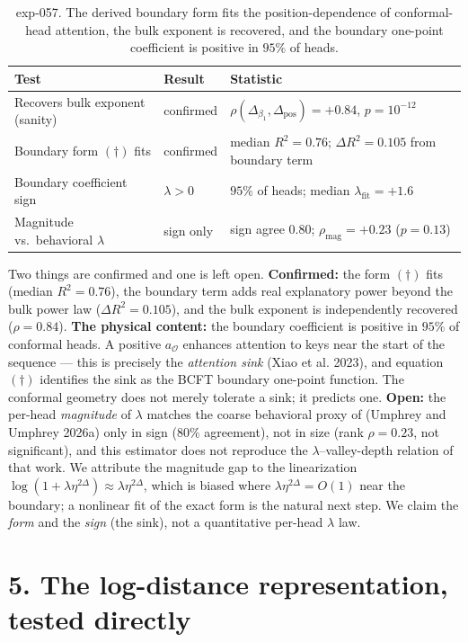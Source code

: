 \begin{table}[H]
\centering
\begin{tabular}{lll}
\toprule
Test & Result & Statistic \\
\midrule
Recovers bulk exponent (sanity) & confirmed & $\rho(\Delta_{\beta_1},\Delta_{\text{pos}}) = +0.84$, $p=10^{-12}$ \\
Boundary form $(\dagger)$ fits & confirmed & median $R^2 = 0.76$; $\Delta R^2 = 0.105$ from boundary term \\
Boundary coefficient sign & $\lambda > 0$ & $95\%$ of heads; median $\lambda_{\text{fit}} = +1.6$ \\
Magnitude vs.\ behavioral $\lambda$ & sign only & sign agree $0.80$; $\rho_{\text{mag}}=+0.23$ ($p=0.13$) \\
\bottomrule
\end{tabular}
\caption{exp-057. The derived boundary form fits the position-dependence
of conformal-head attention, the bulk exponent is recovered, and the
boundary one-point coefficient is positive in $95\%$ of heads.}
\end{table}

Two things are confirmed and one is left open. \textbf{Confirmed:} the
form \((\dagger)\) fits (median \(R^2 = 0.76\)), the boundary term adds
real explanatory power beyond the bulk power law
(\(\Delta R^2 = 0.105\)), and the bulk exponent is independently
recovered (\(\rho = 0.84\)). \textbf{The physical content:} the boundary
coefficient is positive in \(95\%\) of conformal heads. A positive
\(a_{\mathcal O}\) enhances attention to keys near the start of the
sequence --- this is precisely the \emph{attention sink} (Xiao et al.
2023), and equation \((\dagger)\) identifies the sink as the BCFT
boundary one-point function. The conformal geometry does not merely
tolerate a sink; it predicts one. \textbf{Open:} the per-head
\emph{magnitude} of \(\lambda\) matches the coarse behavioral proxy of
(Umphrey and Umphrey 2026a) only in sign (\(80\%\) agreement), not in
size (rank \(\rho = 0.23\), not significant), and this estimator does
not reproduce the \(\lambda\)--valley-depth relation of that work. We
attribute the magnitude gap to the linearization
\(\log(1+\lambda\eta^{2\Delta}) \approx \lambda\eta^{2\Delta}\), which
is biased where \(\lambda\eta^{2\Delta} = O(1)\) near the boundary; a
nonlinear fit of the exact form is the natural next step. We claim the
\emph{form} and the \emph{sign} (the sink), not a quantitative per-head
\(\lambda\) law.

\section{5. The log-distance representation, tested
directly}\label{the-log-distance-representation-tested-directly}

